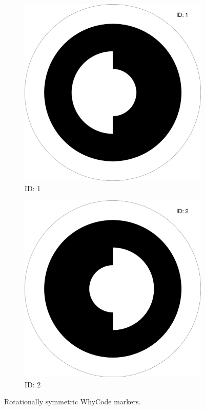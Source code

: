 \begin{figure}
    \centering
    \begin{subfigure}[b]{0.3\textwidth}
        \centering
        \includegraphics[width=\textwidth]{images/00000001.png}
        \caption{ID: 1}
        \label{fig:whycode_1}
    \end{subfigure}
    \begin{subfigure}[b]{0.3\textwidth}
        \centering
        \includegraphics[width=\textwidth]{images/00000002.png}
        \caption{ID: 2}
        \label{fig:whycode_2}
    \end{subfigure}
    \caption{Rotationally symmetric WhyCode markers.}
    \label{fig:rotationally_symmetric WhyCode markers.}
\end{figure}

